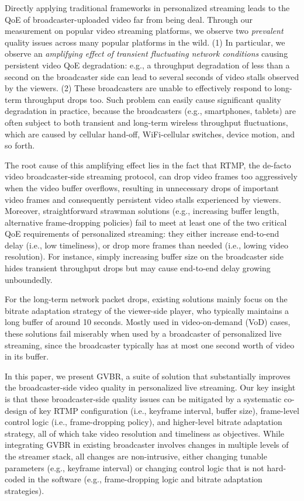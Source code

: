 Directly applying traditional frameworks in personalized streaming leads to the QoE of broadcaster-uploaded video far from being deal. Through our measurement on popular video streaming platforms, we observe two {\em prevalent} quality issues across many popular platforms in the wild.  (1) In particular, we observe an
{\em amplifying effect of transient fluctuating network conditions} causing persistent video QoE degradation: e.g., a throughput degradation of less than a second on the broadcaster side can lead to several seconds of video stalls observed by the viewers. (2)  These broadcasters are unable to effectively respond to long-term throughput drops too.
Such problem can easily cause significant quality degradation in practice, because the broadcasters (e.g., smartphones, tablets) are often subject to both transient and long-term wireless throughput fluctuations, which are caused by cellular hand-off,
WiFi-cellular switches, device motion, and so forth.


The root cause of this amplifying effect lies in the fact that RTMP,
the de-facto video broadcaster-side streaming protocol, can drop video frames too aggressively when the video buffer overflows, resulting in unnecessary drops of important video frames and consequently persistent video stalls experienced by viewers.
Moreover, straightforward strawman solutions (e.g., increasing
buffer length, alternative frame-dropping policies) fail to meet at least one of the two critical QoE requirements of personalized streaming: they either increase end-to-end delay (i.e., low timeliness), or drop more frames than needed (i.e., lowing video resolution).
For instance, simply increasing buffer size on the broadcaster
side hides transient throughput drops but may cause end-to-end
delay growing unboundedly.

For the long-term network packet drops, existing solutions mainly focus on the bitrate adaptation strategy of the viewer-side player, who typically maintains a long buffer of around 10 seconds. Mostly used in video-on-demand (VoD) cases,
these solutions fail miserably when used by a broadcaster of personalized live streaming, since the broadcaster typically has at most one second worth of video in its buffer.

In this paper, we present GVBR, a suite of solution that substantially improves
the broadcaster-side video quality in personalized live streaming.
Our key insight is that these broadcaster-side quality issues can be mitigated
by a systematic co-design of key RTMP configuration (i.e., keyframe
interval, buffer size), frame-level control logic (i.e., frame-dropping policy),
and higher-level bitrate adaptation strategy, all of which take
video resolution and timeliness as objectives.
While integrating GVBR in existing broadcaster involves changes in multiple
levels of the streamer stack, all changes are non-intrusive, either changing
tunable parameters (e.g., keyframe interval) or changing control logic that
is not hard-coded in the software (e.g., frame-dropping logic and bitrate
adaptation strategies).


